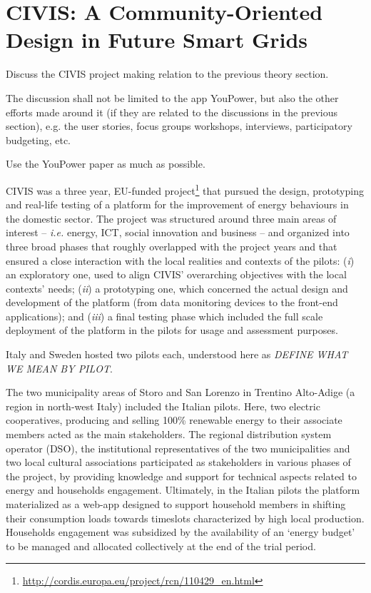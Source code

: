 \section{CIVIS: A Community-Oriented Design in Future Smart Grids}

\begin{svgraybox}
Discuss the CIVIS project making relation to the previous theory section. 

The discussion shall not be limited to the app YouPower, but also the other efforts made around it (if they are related to the discussions in the previous section), e.g. the user stories, focus groups workshops, interviews, participatory budgeting, etc. 

Use the YouPower paper as much as possible. 
\end{svgraybox}

CIVIS was a three year, EU-funded project\footnote{\url{http://cordis.europa.eu/project/rcn/110429\_en.html}} that pursued the design, prototyping and real-life testing of a platform
for the improvement of energy behaviours in the domestic sector. The project was structured around three main areas
of interest – \textit{i.e.} energy, ICT, social innovation and business – and organized into three broad phases that roughly
overlapped with the project years and that ensured a close interaction with the local realities and contexts of
the pilots: (\textit{i}) an exploratory one, used to align CIVIS’ overarching objectives with the local contexts’ needs;
(\textit{ii}) a prototyping one, which concerned the actual design and development of the platform (from data monitoring devices to the
front-end applications); and (\textit{iii}) a final testing phase which included the full scale deployment of the platform in the pilots for usage and assessment purposes.

Italy and Sweden hosted two pilots each, understood here as \textit{DEFINE WHAT WE MEAN BY PILOT}.

The two municipality areas of Storo and San Lorenzo in Trentino Alto-Adige (a region in north-west Italy) included the
Italian pilots. Here, two electric cooperatives, producing and selling 100\% renewable energy
to their associate members acted as the main stakeholders. The regional distribution system operator (DSO),
the institutional representatives of the two municipalities and two local cultural associations participated as
stakeholders in various phases of the project, by providing knowledge and support for technical aspects related
to energy and households engagement. Ultimately, in the Italian pilots the platform materialized as a web-app
designed to support household members in shifting their consumption loads towards timeslots characterized by high
local production. Households engagement was subsidized by the availability of an `energy budget' to be managed
and allocated collectively at the end of the trial period.

